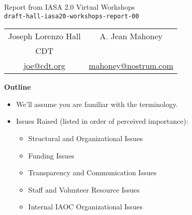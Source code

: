 \documentclass[helvetica]{seminar}
\newcommand{\heading}[1]{%
  \begin{center} 
    \large\bf 
    #1 
  \end{center} 
  \vspace{.4 in}}
\begin{document}
\begin{slide}
\begin{center}
\vspace{.5 in}
\LARGE{{\bf}Report from IASA 2.0 Virtual Workshops\\{\small \verb^draft-hall-iasa20-workshops-report-00^}}\\
\vspace{.2in}
\large{
\begin{tabular}{ c c }
Joseph Lorenzo Hall & A. Jean Mahoney\\
CDT & \\
\url{joe@cdt.org} & \url{mahoney@nostrum.com}
\end{tabular}
}
\end{center}
\end{slide}

\centerslidesfalse 

\begin{slide}
\heading{Outline}

\begin{itemize}
\item We'll assume you are familiar with the terminology.
\item Issues Raised (listed in order of perceived importance):
  \begin{itemize}
  \item Structural and Organizational Issues
  \item Funding Issues
  \item Transparency and Communication Issues
  \item Staff and Volunteer Resource Issues
  \item Internal IAOC Organizational Issues
  \end{itemize}
\end{itemize}

\end{slide}
\end{document}
